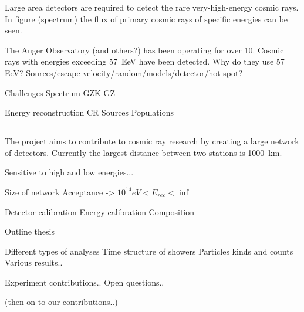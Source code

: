 Large area detectors are required to detect the rare very-high-energy
cosmic rays. In figure (spectrum) the flux of primary cosmic rays of
specific energies can be seen. 

The Auger Observatory (and others?) has been operating for over
\SI{10}{\year}. Cosmic rays with energies exceeding
\SI{57}{\exa\electronvolt} have been detected. Why do they use 57 EeV?
Sources/escape velocity/random/models/detector/hot spot?

Challenges
Spectrum
GZK
GZ

Energy reconstruction
CR Sources
Populations


\subsection{\hisparc}

The \hisparc project aims to contribute to cosmic ray research by
creating a large network of detectors. Currently the largest distance
between two stations is \SI{1000}{\kilo\meter}.

Sensitive to high and low energies...



Size of network
Acceptance -> $10^{14} eV < E_{rec} < \inf$

Detector calibration
Energy calibration
Composition

Outline thesis

    Different types of analyses
    Time structure of showers
    Particles kinds and counts
    Various results..

Experiment contributions..
Open questions..

(then on to our contributions..)
